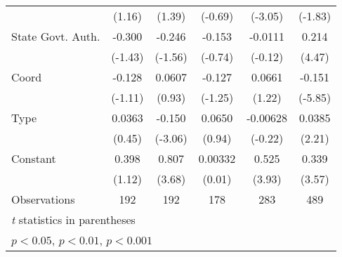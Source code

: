 \begin{table}[htbp]
\begin{tabular}{l*{5}{c}}
                                        &   (1.16)         &   (1.39)         &  (-0.69)         &  (-3.05)         &  (-1.83)         \\
\addlinespace
State Govt. Auth.                       &   -0.300         &   -0.246         &   -0.153         &  -0.0111         &    0.214\sym{***}\\
                                        &  (-1.43)         &  (-1.56)         &  (-0.74)         &  (-0.12)         &   (4.47)         \\
\addlinespace
Coord                                   &   -0.128         &   0.0607         &   -0.127         &   0.0661         &   -0.151\sym{***}\\
                                        &  (-1.11)         &   (0.93)         &  (-1.25)         &   (1.22)         &  (-5.85)         \\
\addlinespace
Type                                    &   0.0363         &   -0.150\sym{**} &   0.0650         & -0.00628         &   0.0385\sym{*}  \\
                                        &   (0.45)         &  (-3.06)         &   (0.94)         &  (-0.22)         &   (2.21)         \\
\addlinespace
Constant                                &    0.398         &    0.807\sym{***}&  0.00332         &    0.525\sym{***}&    0.339\sym{***}\\
                                        &   (1.12)         &   (3.68)         &   (0.01)         &   (3.93)         &   (3.57)         \\
\midrule
Observations                            &      192         &      192         &      178         &      283         &      489         \\
\bottomrule
\multicolumn{6}{l}{\footnotesize \textit{t} statistics in parentheses}\\
\multicolumn{6}{l}{\footnotesize \sym{*} \(p<0.05\), \sym{**} \(p<0.01\), \sym{***} \(p<0.001\)}\\
\end{tabular}
\end{table}
